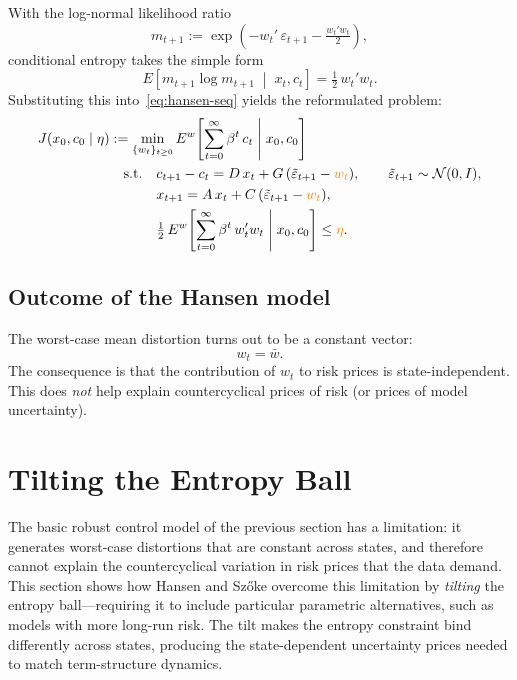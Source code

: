 \documentclass[12pt]{article}
\theoremstyle{definition}
\begin{document}
With the log-normal likelihood ratio
\[
   m_{t+1} := \exp\!\left(- w_t'\, \varepsilon_{t+1}
       - \tfrac{w_t' w_t}{2}\right),
\]
conditional entropy takes the simple form
\[
   E\!\left[m_{t+1}\log m_{t+1} \;\middle|\; x_t, c_t\right]
       = \tfrac{1}{2}\, w_t' w_t.
\]
Substituting this into~\eqref{eq:hansen-seq} yields the reformulated
problem:
\begin{align}
J(x_0, c_0 \mid \eta) &:= \min_{\{w_t\}_{t\geq 0}}
    E^w\!\left[\sum_{t=0}^{\infty} \beta^t\, c_t
    \;\middle|\; x_0, c_0\right] \label{eq:hansen-seq2}\\
&\quad \text{s.t.}\quad
    c_{t+1} - c_t = D\, x_t + G\,(\tilde\varepsilon_{t+1}
    - {\color{orange} w_t}), \qquad
    \tilde\varepsilon_{t+1} \sim {\mathcal N}(0,I), \notag\\
&\quad\hphantom{\text{s.t.}}\quad
    x_{t+1} = A\, x_t + C\,(\tilde\varepsilon_{t+1}
    - {\color{orange} w_t}), \notag\\
&\quad\hphantom{\text{s.t.}}\quad
    \tfrac{1}{2}\, E^w\!\left[\sum_{t=0}^{\infty} \beta^t\,
    w_t' w_t \;\middle|\; x_0, c_0\right] \leq
    {\color{orange} \eta}. \notag
\end{align}

\subsection{Outcome of the Hansen model}

The worst-case mean distortion turns out to be a constant vector:
\[
   w_t = \bar w.
\]
The consequence is that the contribution of $w_t$ to risk prices is
state-independent.  This does \emph{not} help explain countercyclical
prices of risk (or prices of model uncertainty).


\section{Tilting the Entropy Ball}
\label{sec:tilted}

The basic robust control model of the previous section has a limitation:
it generates worst-case distortions that are constant across states, and
therefore cannot explain the countercyclical variation in risk prices
that the data demand.  This section shows how Hansen and Sz\H{o}ke
overcome this limitation by \emph{tilting} the entropy ball---requiring
it to include particular parametric alternatives, such as models with
more long-run risk.  The tilt makes the entropy constraint bind
differently across states, producing the state-dependent uncertainty
prices needed to match term-structure dynamics.
\end{document}
